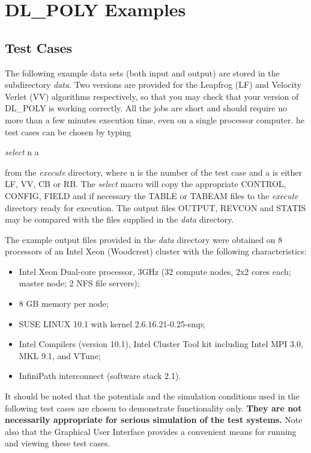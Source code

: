 \section{DL\_POLY Examples}

\subsection{Test Cases}

The following example data sets (both input and output) are stored in
the subdirectory {\em data}. Two versions are provided for the
Leapfrog (LF) and Velocity Verlet (VV) algorithms respectively,
so that you may check that your version of DL\_POLY is
working correctly.  All the jobs are short and should require no more
than a few minutes execution time, even on a single processor
computer.  he test cases can be chosen by typing

{\sl select } n a

\noindent from the {\em execute} directory, where n is the number of the test
case and a is either LF, VV, CB or RB.  The {\sl select} macro will
copy the appropriate CONTROL, CONFIG, FIELD and if necessary the TABLE
or TABEAM files to the {\em execute} directory ready for execution.
The output files OUTPUT, REVCON and STATIS may be compared with the
files supplied in the {\em data} directory.

The example output files provided in the {\em data} directory were
obtained on 8 processors of an Intel Xeon (Woodcrest) cluster with the
following characteristics:
\begin{itemize}
\item Intel Xeon Dual-core processor, 3GHz (32 compute nodes, 2x2 cores each;
master node; 2 NFS file servers);
\item 8 GB memory per node;
\item SUSE LINUX 10.1 with kernel 2.6.16.21-0.25-smp;
\item Intel Compilers (version 10.1), Intel Cluster Tool kit including Intel
MPI 3.0, MKL 9.1, and VTune;
\item InfiniPath interconnect (software stack 2.1).
\end{itemize}

It should be noted that the potentials and the simulation conditions
used in the following test cases are chosen to demonstrate
functionality only.  {\bf They are not necessarily appropriate for serious
simulation of the test systems.}  Note also that the \D{} Graphical User
Interface \cite{smith-gui} provides a convenient means for running and
viewing these test cases.

